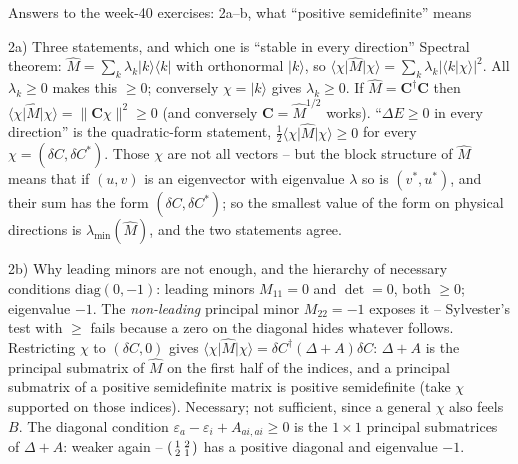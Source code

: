 \documentclass[aspectratio=169,10pt]{beamer}
\newcommand{\ket}[1]{\vert #1\rangle}
\newcommand{\bra}[1]{\langle #1\vert}
\newcommand{\braket}[2]{\langle #1\vert #2\rangle}
\newcommand{\ketbra}[2]{\vert #1\rangle\langle #2\vert}
\begin{document}
\begin{frame}{Answers to the week-40 exercises: 2a--b, what ``positive semidefinite'' means}
  \footnotesize
  \begin{block}{2a) Three statements, and which one is ``stable in every direction''}
    Spectral theorem: $\hat M=\sum_k\lambda_k\ketbra{k}{k}$ with orthonormal $\ket k$, so $\bra\chi\hat M\ket\chi=\sum_k\lambda_k|\braket{k}{\chi}|^2$. All $\lambda_k\ge0$ makes this $\ge0$; conversely $\chi=\ket k$ gives $\lambda_k\ge0$. If $\hat M=\bm C^{\dagger}\bm C$ then $\bra\chi\hat M\ket\chi=\|\bm C\chi\|^2\ge0$ (and conversely $\bm C=\hat M^{1/2}$ works). ``$\Delta E\ge0$ in every direction'' is the quadratic-form statement, $\frac12\bra\chi\hat M\ket\chi\ge0$ for every $\chi=(\delta C,\delta C^{*})$. Those $\chi$ are not all vectors -- but the block structure of $\hat M$ means that if $(u,v)$ is an eigenvector with eigenvalue $\lambda$ so is $(v^{*},u^{*})$, and their sum has the form $(\delta C,\delta C^{*})$; so the smallest value of the form on physical directions is $\lambda_{\min}(\hat M)$, and the two statements agree.
  \end{block}
  \begin{block}{2b) Why leading minors are not enough, and the hierarchy of necessary conditions}
    $\mathrm{diag}(0,-1)$: leading minors $M_{11}=0$ and $\det=0$, both $\ge0$; eigenvalue $-1$. The \emph{non-leading} principal minor $M_{22}=-1$ exposes it -- Sylvester's test with $\ge$ fails because a zero on the diagonal hides whatever follows. Restricting $\chi$ to $(\delta C,0)$ gives $\bra\chi\hat M\ket\chi=\delta C^{\dagger}(\Delta+A)\delta C$: $\Delta+A$ is the principal submatrix of $\hat M$ on the first half of the indices, and a principal submatrix of a positive semidefinite matrix is positive semidefinite (take $\chi$ supported on those indices). Necessary; not sufficient, since a general $\chi$ also feels $B$. The diagonal condition $\varepsilon_a-\varepsilon_i+A_{ai,ai}\ge0$ is the $1\times1$ principal submatrices of $\Delta+A$: weaker again -- $\begin{psmallmatrix}1&2\\2&1\end{psmallmatrix}$ has a positive diagonal and eigenvalue $-1$.
  \end{block}
\end{frame}
\end{document}
